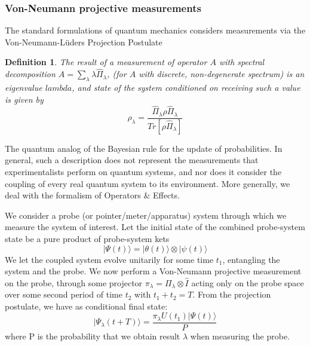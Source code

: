 \subsubsection{Von-Neumann projective measurements}
The standard formulations of quantum mechanics considers measurements via the Von-Neumann-L\"uders Projection Postulate\cite{Dirac1927}
\newtheorem{definition}{Definition}
\begin{definition}
    The result of a measurement of operator $A$ with spectral decomposition $A = \sum_\lambda \lambda \hat{\Pi}_\lambda $, (for $A$ with discrete, non-degenerate spectrum) is an eigenvalue $lambda$, and state of the system conditioned on receiving such a value is given by
    \begin{equation}
        \rho_\lambda = \frac{\hat{\Pi}_\lambda \rho \hat{\Pi}_\lambda}{Tr[\rho\hat{\Pi}_\lambda]}
    \end{equation}
\end{definition}
The quantum analog of the Bayesian rule for the update of probabilities.
In general, such a description does not represent the measurements that experimentalists perform on quantum systems, and nor does it consider the coupling of every real quantum system to its environment. More generally, we deal with the formalism of Operators \& Effects.

We consider a probe (or pointer/meter/apparatus) system through which we measure the system of interest. Let the initial state of the combined probe-system state be a pure product of probe-system kets
\begin{equation}
  | \Psi (t) \rangle = | \theta (t) \rangle \otimes | \psi (t) \rangle
\end{equation}
We let the coupled system evolve unitarily for some time $t_1$, entangling the system and the probe. We now perform a Von-Neumann projective measurement on the probe, through some projector $\pi_\lambda = \Pi_\lambda \otimes \hat{I}$ acting only on the probe space over some second period of time $t_2$ with $t_1 + t_2 = T$. From the projection postulate, we have as conditional final state:
\begin{equation}
    | \Psi_\lambda (t+T) \rangle = \frac{\pi_\lambda U(t_1) |\Psi(t)\rangle}{P}
\end{equation}
where P is the probability that we obtain result $\lambda$ when measuring the probe.

